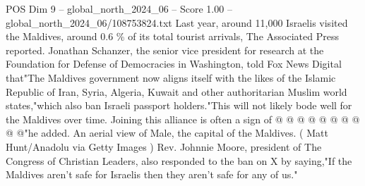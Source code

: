 \begin{textsample}{POS Dim 9 – global\_north\_2024\_06 – Score 1.00 – global\_north\_2024\_06/108753824.txt}
Last year, around 11,000 Israelis visited the Maldives, around 0.6 \% of its total tourist arrivals, The Associated Press reported.
Jonathan Schanzer, the senior vice president for research at the Foundation for Defense of Democracies in Washington, told Fox News Digital that"The Maldives government now aligns itself with the likes of the Islamic Republic of Iran, Syria, Algeria, Kuwait and other authoritarian Muslim world states,"which also ban Israeli passport holders."This will not likely bode well for the Maldives over time.
Joining this alliance is often a sign of @ @ @ @ @ @ @ @ @ @"he added.
An aerial view of Male, the capital of the Maldives. ( Matt Hunt/Anadolu via Getty Images ) Rev.
Johnnie Moore, president of The Congress of Christian Leaders, also responded to the ban on X by saying,"If the Maldives aren't safe for Israelis then they aren't safe for any of us."

\end{textsample}

